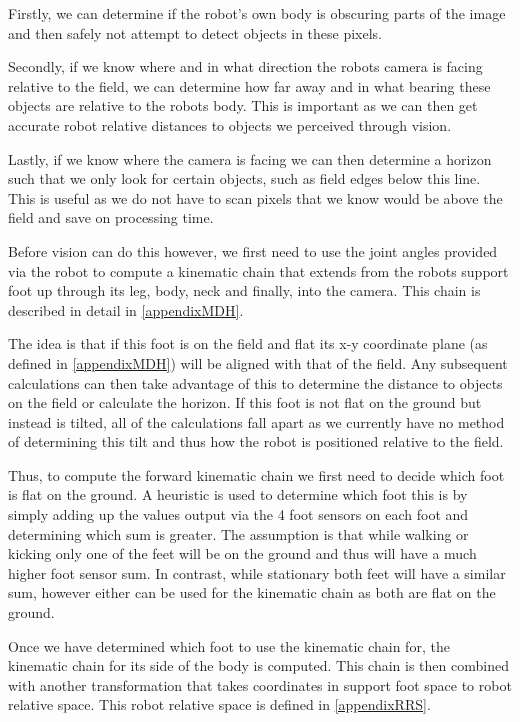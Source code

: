 \documentclass[pdftex,11pt,a4paper]{report}
\begin{document}
Firstly, we can determine if the robot's own body is obscuring parts of the image and then safely not attempt to detect objects in these pixels. 

Secondly, if we know where and in what direction the robots camera is facing relative to the field, we can determine how far away and in what bearing these objects are relative to the robots body. This is important as we can then get accurate robot relative distances to objects we perceived through vision.

Lastly, if we know where the camera is facing we can then determine a horizon such that we only look for certain objects, such as field edges below this line. This is useful as we do not have to scan pixels that we know would be above the field and save on processing time.

Before vision can do this however, we first need to use the joint angles provided via the robot to compute a kinematic chain that extends from the robots support foot up through its leg, body, neck and finally, into the camera. This chain is described in detail in \autoref{appendixMDH}.

The idea is that if this foot is on the field and flat its x-y coordinate plane (as defined in \autoref{appendixMDH}) will be aligned with that of the field. Any subsequent calculations can then take advantage of this to determine the distance to objects on the field or calculate the horizon. If this foot is not flat on the ground but instead is tilted, all of the calculations fall apart as we currently have no method of determining this tilt and thus how the robot is positioned relative to the field. 

Thus, to compute the forward kinematic chain we first need to decide which foot is flat on the ground. A heuristic is used to determine which foot this is by simply adding up the values output via the 4 foot sensors on each foot and determining which sum is greater. The assumption is that while walking or kicking only one of the feet will be on the ground and thus will have a much higher foot sensor sum. In contrast, while stationary both feet will have a similar sum, however either can be used for the kinematic chain as both are flat on the ground.

Once we have determined which foot to use the kinematic chain for, the kinematic chain for its side of the body is computed. This chain is then combined with another transformation that takes coordinates in support foot space to robot relative space. This robot relative space is defined in \autoref{appendixRRS}.
\end{document}
